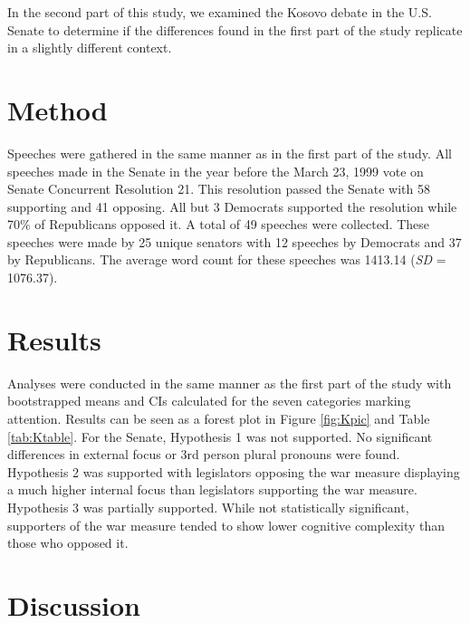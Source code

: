 \documentclass[english,,man]{apa6}
\begin{document}
In the second part of this study, we examined the Kosovo debate in the U.S. Senate to determine if the differences found in the first part of the study replicate in a slightly different context.

\hypertarget{method-2}{%
\section{Method}\label{method-2}}

Speeches were gathered in the same manner as in the first part of the study. All speeches made in the Senate in the year before the March 23, 1999 vote on Senate Concurrent Resolution 21. This resolution passed the Senate with 58 supporting and 41 opposing. All but 3 Democrats supported the resolution while 70\% of Republicans opposed it. A total of 49 speeches were collected. These speeches were made by 25 unique senators with 12 speeches by Democrats and 37 by Republicans. The average word count for these speeches was 1413.14 (\emph{SD} = 1076.37).

\hypertarget{results-1}{%
\section{Results}\label{results-1}}

Analyses were conducted in the same manner as the first part of the study with bootstrapped means and CIs calculated for the seven categories marking attention. Results can be seen as a forest plot in Figure \ref{fig:Kpic} and Table \ref{tab:Ktable}. For the Senate, Hypothesis 1 was not supported. No significant differences in external focus or 3rd person plural pronouns were found. Hypothesis 2 was supported with legislators opposing the war measure displaying a much higher internal focus than legislators supporting the war measure. Hypothesis 3 was partially supported. While not statistically significant, supporters of the war measure tended to show lower cognitive complexity than those who opposed it.

\hypertarget{discussion}{%
\section{Discussion}\label{discussion}}
\end{document}
